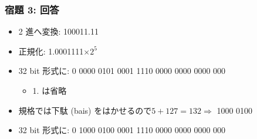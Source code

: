 \begin{frame}
\frametitle{宿題 3: 回答}
  \begin{itemize}
\item 2 進へ変換: 100011.11
\item 正規化: 1.0001111$\times 2^5$
\item 32 bit 形式に: {\scriptsize 0 0000 0101 0001 1110 0000 0000 0000 000}
    \begin{itemize}
\item 1. は省略
    \end{itemize}
\item 規格\href{http://ieeexplore.ieee.org/xpl/mostRecentIssue.jsp?punumber=2355}{}では下駄 (bais) をはかせるので\(5+127=132\Rightarrow\) 1000 0100
\item 32 bit 形式に: {\scriptsize 0 1000 0100 0001 1110 0000 0000 0000 000}
  \end{itemize}
\end{frame}
